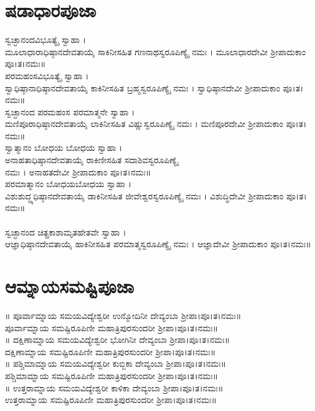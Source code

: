 \section{ಷಡಾಧಾರಪೂಜಾ}
 ಸ್ವಚ್ಛಾನಂದವಿಭೂತ್ಯೈ ಸ್ವಾಹಾ ।\\ ಮೂಲಾಧಾರಾಧಿಷ್ಠಾನದೇವತಾಯೈ ಸಾಕಿನೀಸಹಿತ ಗಣನಾಥಸ್ವರೂಪಿಣ್ಯೈ ನಮಃ ।  ಮೂಲಾಧಾರದೇವೀ ಶ್ರೀಪಾದುಕಾಂ ಪೂ।ತ।ನಮಃ॥\\
 ಪರಮಹಂಸವಿಭೂತ್ಯೈ ಸ್ವಾಹಾ ।\\ ಸ್ವಾಧಿಷ್ಠಾನಾಧಿಷ್ಠಾನದೇವತಾಯೈ  ಕಾಕಿನೀಸಹಿತ  ಬ್ರಹ್ಮಸ್ವರೂಪಿಣ್ಯೈ ನಮಃ । ಸ್ವಾಧಿಷ್ಠಾನದೇವೀ ಶ್ರೀಪಾದುಕಾಂ ಪೂ।ತ।ನಮಃ॥\\
ಸ್ವಚ್ಛಾನಂದ ಪರಮಹಂಸ ಪರಮಾತ್ಮನೇ ಸ್ವಾಹಾ ।\\ ಮಣಿಪೂರಾಧಿಷ್ಠಾನದೇವತಾಯೈ ಲಾಕಿನೀಸಹಿತ ವಿಷ್ಣುಸ್ವರೂಪಿಣ್ಯೈ ನಮಃ । ಮಣಿಪೂರದೇವೀ ಶ್ರೀಪಾದುಕಾಂ ಪೂ।ತ।ನಮಃ॥\\
 ಸ್ವಾತ್ಮಾನಂ ಬೋಧಯ ಬೋಧಯ ಸ್ವಾಹಾ ।\\ ಅನಾಹತಾಧಿಷ್ಠಾನದೇವತಾಯೈ ರಾಕಿಣೀಸಹಿತ ಸದಾಶಿವಸ್ವರೂಪಿಣ್ಯೈ\\ ನಮಃ । ಅನಾಹತದೇವೀ ಶ್ರೀಪಾದುಕಾಂ ಪೂ।ತ।ನಮಃ॥\\
ಪರಮಾತ್ಮಾನಂ ಬೋಧಯಬೋಧಯ ಸ್ವಾಹಾ ।\\ ವಿಶುಶುದ್ಧ್ಯಧಿಷ್ಠಾನದೇವತಾಯೈ ಡಾಕಿನೀಸಹಿತ ಜೀವೇಶ್ವರಸ್ವರೂಪಿಣ್ಯೈ ನಮಃ । ವಿಶುದ್ಧಿದೇವೀ ಶ್ರೀಪಾದುಕಾಂ ಪೂ।ತ।ನಮಃ॥\\
\\ ಸ್ವಚ್ಛಾನಂದ ಚಿತ್ಪ್ರಕಾಶಾಮೃತಹೇತವೇ ಸ್ವಾಹಾ ।\\ ಆಜ್ಞಾಧಿಷ್ಠಾನದೇವತಾಯೈ ಹಾಕಿನೀಸಹಿತ ಪರಮಾತ್ಮಸ್ವರೂಪಿಣ್ಯೈ ನಮಃ । ಆಜ್ಞಾದೇವೀ ಶ್ರೀಪಾದುಕಾಂ ಪೂ।ತ।ನಮಃ॥
\section{ಆಮ್ನಾಯಸಮಷ್ಟಿಪೂಜಾ}
॥ ಪೂರ್ವಾಮ್ನಾಯ ಸಮಯವಿದ್ಯೇಶ್ವರೀ ಉನ್ಮೋದಿನೀ ದೇವ್ಯಂಬಾ ಶ್ರೀಪಾ।ಪೂ।ತ।ನಮಃ॥\\
 ಪೂರ್ವಾಮ್ನಾಯ ಸಮಷ್ಟಿರೂಪಿಣೀ ಮಹಾತ್ರಿಪುರಸುಂದರೀ ಶ್ರೀಪಾ।ಪೂ।ತ।ನಮಃ॥\\
॥ ದಕ್ಷಿಣಾಮ್ನಾಯ ಸಮಯವಿದ್ಯೇಶ್ವರೀ ಭೋಗಿನೀ ದೇವ್ಯಂಬಾ ಶ್ರೀಪಾ।ಪೂ।ತ।ನಮಃ॥\\
 ದಕ್ಷಿಣಾಮ್ನಾಯ ಸಮಷ್ಟಿರೂಪಿಣೀ ಮಹಾತ್ರಿಪುರಸುಂದರೀ ಶ್ರೀಪಾ।ಪೂ।ತ।ನಮಃ॥\\
॥ ಪಶ್ಚಿಮಾಮ್ನಾಯ ಸಮಯವಿದ್ಯೇಶ್ವರೀ ಕುಬ್ಜಿಕಾ ದೇವ್ಯಂಬಾ ಶ್ರೀಪಾ।ಪೂ।ತ।ನಮಃ॥\\
 ಪಶ್ಚಿಮಾಮ್ನಾಯ ಸಮಷ್ಟಿರೂಪಿಣೀ ಮಹಾತ್ರಿಪುರಸುಂದರೀ ಶ್ರೀಪಾ।ಪೂ।ತ।ನಮಃ॥\\
॥ ಉತ್ತರಾಮ್ನಾಯ ಸಮಯವಿದ್ಯೇಶ್ವರೀ ಕಾಳಿಕಾ ದೇವ್ಯಂಬಾ ಶ್ರೀಪಾ।ಪೂ।ತ।ನಮಃ॥\\
 ಉತ್ತರಾಮ್ನಾಯ ಸಮಷ್ಟಿರೂಪಿಣೀ ಮಹಾತ್ರಿಪುರಸುಂದರೀ ಶ್ರೀಪಾ।ಪೂ।ತ।ನಮಃ॥

